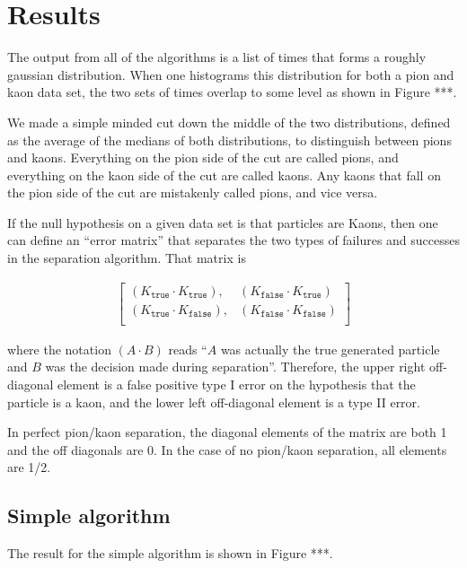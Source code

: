 \documentclass[12pt,twoside,letterpaper]{article}
\begin{document}
\section{Results}

The output from all of the algorithms is a list of times that forms a roughly gaussian distribution. When one histograms this distribution for both a pion and kaon data set, the two sets of times overlap to some level as shown in Figure ***. 

We made a simple minded cut down the middle of the two distributions, defined as the average of the medians of both distributions, to distinguish between pions and kaons. Everything on the pion side of the cut are called pions, and everything on the kaon side of the cut are called kaons. Any kaons that fall on the pion side of the cut are mistakenly called pions, and vice versa. 

If the null hypothesis on a given data set is that particles are Kaons, then one can define an ``error matrix'' that separates the two types of failures and successes in the separation algorithm. That matrix is 

\begin{align}
\begin{bmatrix}
(K_{\texttt{true}} \cdot K_{\texttt{true}}), & (K_{\texttt{false}} \cdot K_{\texttt{true}}) \\
(K_{\texttt{true}} \cdot K_{\texttt{false}}), & (K_{\texttt{false}} \cdot K_{\texttt{false}})\\
\end{bmatrix} 
\end{align}

where the notation $(A \cdot B)$ reads ``$A$ was actually the true generated particle and $B$ was the decision made during separation''. Therefore, the upper right off-diagonal element is a false positive type I error on the hypothesis that the particle is a kaon, and the lower left off-diagonal element is a type II error. 

In perfect pion/kaon separation, the diagonal elements of the matrix are both 1 and the off diagonals are 0. In the case of no pion/kaon separation, all elements are 1/2.  

\subsection{Simple algorithm}

The result for the simple algorithm is shown in Figure ***. 
\end{document}
